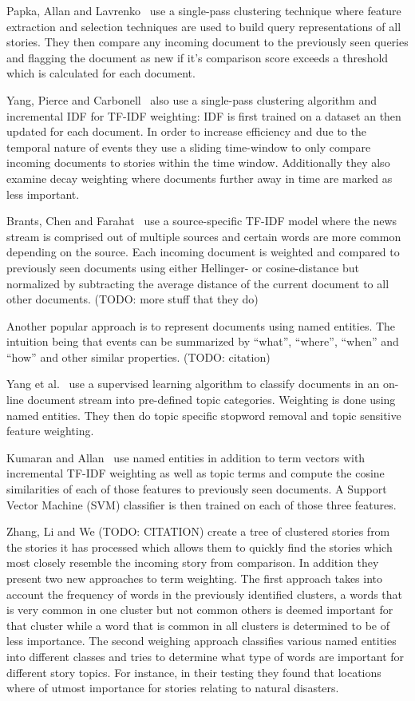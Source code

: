 Papka, Allan and Lavrenko~\cite{papka1998online} use a single-pass clustering technique where feature extraction and selection techniques are used to build query representations of all stories. They then compare any incoming document to the previously seen queries and flagging the document as new if it's comparison score exceeds a threshold which is calculated for each document.

Yang, Pierce and Carbonell~\cite{yang1998study} also use a single-pass clustering algorithm and incremental IDF for TF-IDF weighting: IDF is first trained on a dataset an then updated for each document. In order to increase efficiency and due to the temporal nature of events they use a sliding time-window to only compare incoming documents to stories within the time window. Additionally they also examine decay weighting where documents further away in time are marked as less important.

Brants, Chen and Farahat~\cite{brants2003system} use a source-specific TF-IDF model where the news stream is comprised out of multiple sources and certain words are more common depending on the source. Each incoming document is weighted and compared to previously seen documents using either Hellinger- or cosine-distance but normalized by subtracting the average distance of the current document to all other documents. (TODO: more stuff that they do)

Another popular approach is to represent documents using named entities. The intuition being that events can be summarized  by ``what'', ``where'', ``when'' and ``how'' and other similar properties. (TODO: citation)

Yang et al.~\cite{yang2002topic} use a supervised learning algorithm to classify documents in an on-line document stream into pre-defined topic categories. Weighting is done using named entities. They then do topic specific stopword removal and topic sensitive feature weighting.

Kumaran and Allan~\cite{kumaran2005using} use named entities in addition to term vectors with incremental TF-IDF weighting as well as topic terms and compute the cosine similarities of each of those features to previously seen documents. A Support Vector Machine (SVM) classifier is then trained on each of those three features.

Zhang, Li and We (TODO: CITATION) create a tree of clustered stories from the stories it has processed which allows them to quickly find the stories which most closely resemble the incoming story from comparison. In addition they present two new approaches to term weighting. The first approach takes into account the frequency of words in the previously identified clusters, a words that is very common in one cluster but not common others is deemed important for that cluster while a word that is common in all clusters is determined to be of less importance. The second weighing approach classifies various named entities into different classes and tries to determine what type of words are important for different story topics. For instance, in their testing they found that locations where of utmost importance for stories relating to natural disasters.

